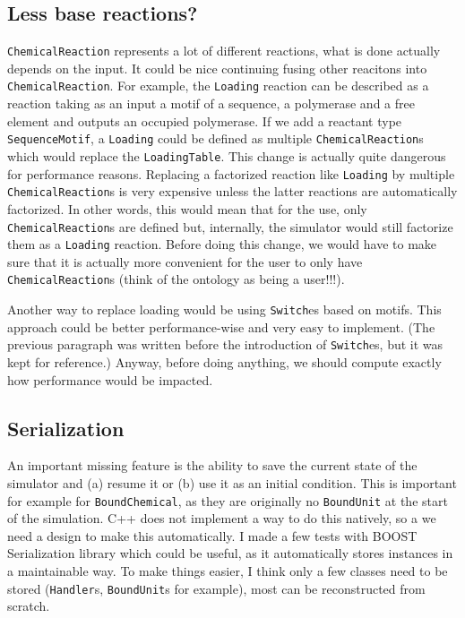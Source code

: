 \subsection{Less base reactions?}

\texttt{ChemicalReaction} represents a lot of different reactions, what is done actually depends on the input. It could be nice continuing fusing other reacitons into \texttt{ChemicalReaction}. For example, the \texttt{Loading} reaction can be described as a reaction taking as an input a motif of a sequence, a polymerase and a free element and outputs an occupied polymerase. If we add a reactant type \texttt{SequenceMotif}, a \texttt{Loading} could be defined as multiple \texttt{ChemicalReaction}s which would replace the \texttt{LoadingTable}. This change is actually quite dangerous for performance reasons. Replacing a factorized reaction like \texttt{Loading} by multiple \texttt{ChemicalReaction}s is very expensive unless the latter reactions are automatically factorized. In other words, this would mean that for the use, only \texttt{ChemicalReaction}s are defined but, internally, the simulator would still factorize them as a \texttt{Loading} reaction. Before doing this change, we would have to make sure that it is actually more convenient for the user to only have \texttt{ChemicalReaction}s (think of the ontology as being a user!!!).

Another way to replace loading would be using \texttt{Switch}es based on motifs. This approach could be better performance-wise and very easy to implement. (The previous paragraph was written before the introduction of \texttt{Switch}es, but it was kept for reference.) Anyway, before doing anything, we should compute exactly how performance would be impacted.

\subsection{Serialization}

An important missing feature is the ability to save the current state of the simulator and (a) resume it or (b) use it as an initial condition. This is important for example for \texttt{BoundChemical}, as they are originally no \texttt{BoundUnit} at the start of the simulation. C++ does not implement a way to do this natively, so a we need a design to make this automatically. I made a few tests with BOOST Serialization library which could be useful, as it automatically stores instances in a maintainable way. To make things easier, I think only a few classes need to be stored (\texttt{Handler}s, \texttt{BoundUnit}s for example), most can be reconstructed from scratch.

